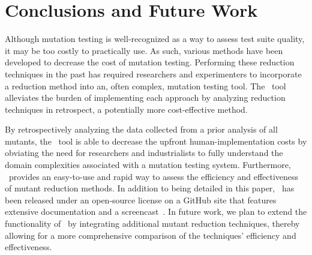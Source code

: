 
\section{Conclusions and Future Work}



Although mutation testing is well-recognized as a way to assess test suite quality, it may be too costly to practically
use. As such, various methods have been developed to decrease the cost of mutation testing. Performing these reduction
techniques in the past has required researchers and experimenters to incorporate a reduction method into an, often
complex, mutation testing tool. The \mr~tool alleviates the burden of implementing each approach by analyzing reduction
techniques in retrospect, a potentially more cost-effective method.


By retrospectively analyzing the data collected from a prior analysis of all mutants, the \mr~tool is able to decrease
the upfront human-implementation costs by obviating the need for researchers and industrialists to fully understand the
domain complexities associated with a mutation testing system.  Furthermore, \mr~provides an easy-to-use and rapid way
to assess the efficiency and effectiveness of mutant reduction methods. In addition to being detailed in this paper,
\mr~has been released under an open-source license on a GitHub site that features extensive documentation and a
screencast~\cite{tool}. In future work, we plan to extend the functionality of \mr~by integrating additional mutant
reduction techniques, thereby allowing for a more comprehensive comparison of the techniques' efficiency and
effectiveness.

